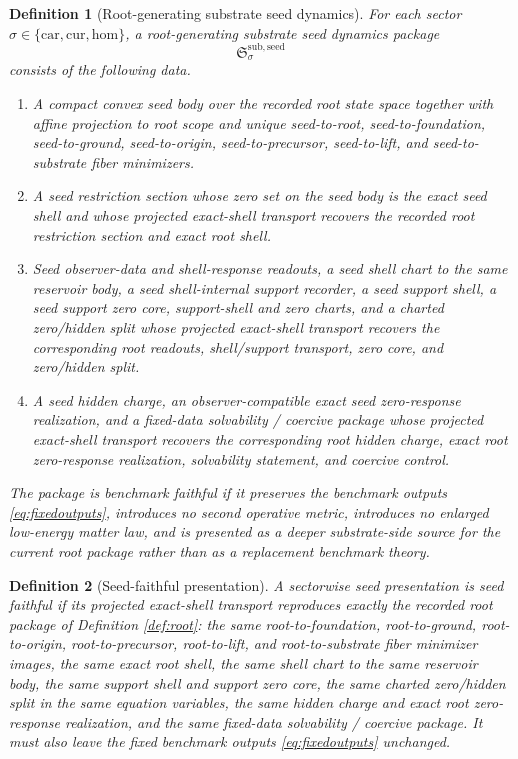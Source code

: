\documentclass[11pt]{article}
\newcommand{\Car}{\mathrm{car}}
\newcommand{\Cur}{\mathrm{cur}}
\newcommand{\Hom}{\mathrm{hom}}
\newcommand{\SeedPackage}{\mathfrak S^{\mathrm{sub,seed}}}
\newtheorem{definition}{Definition}
\begin{document}
\begin{definition}[Root-generating substrate seed dynamics]
\label{def:seed}
For each sector \(\sigma\in\{\Car,\Cur,\Hom\}\), a \emph{root-generating substrate seed dynamics package}
\[
\SeedPackage_{\sigma}
\]
consists of the following data.
\begin{enumerate}
    \item A compact convex seed body over the recorded root state space together with affine projection to root scope and unique seed-to-root, seed-to-foundation, seed-to-ground, seed-to-origin, seed-to-precursor, seed-to-lift, and seed-to-substrate fiber minimizers.
    \item A seed restriction section whose zero set on the seed body is the exact seed shell and whose projected exact-shell transport recovers the recorded root restriction section and exact root shell.
    \item Seed observer-data and shell-response readouts, a seed shell chart to the same reservoir body, a seed shell-internal support recorder, a seed support shell, a seed support zero core, support-shell and zero charts, and a charted zero/hidden split whose projected exact-shell transport recovers the corresponding root readouts, shell/support transport, zero core, and zero/hidden split.
    \item A seed hidden charge, an observer-compatible exact seed zero-response realization, and a fixed-data solvability / coercive package whose projected exact-shell transport recovers the corresponding root hidden charge, exact root zero-response realization, solvability statement, and coercive control.
\end{enumerate}
The package is \emph{benchmark faithful} if it preserves the benchmark outputs \eqref{eq:fixedoutputs}, introduces no second operative metric, introduces no enlarged low-energy matter law, and is presented as a deeper substrate-side source for the current root package rather than as a replacement benchmark theory.
\end{definition}

\begin{definition}[Seed-faithful presentation]
\label{def:faithful}
A sectorwise seed presentation is \emph{seed faithful} if its projected exact-shell transport reproduces exactly the recorded root package of Definition \ref{def:root}: the same root-to-foundation, root-to-ground, root-to-origin, root-to-precursor, root-to-lift, and root-to-substrate fiber minimizer images, the same exact root shell, the same shell chart to the same reservoir body, the same support shell and support zero core, the same charted zero/hidden split in the same equation variables, the same hidden charge and exact root zero-response realization, and the same fixed-data solvability / coercive package. It must also leave the fixed benchmark outputs \eqref{eq:fixedoutputs} unchanged.
\end{definition}
\end{document}
